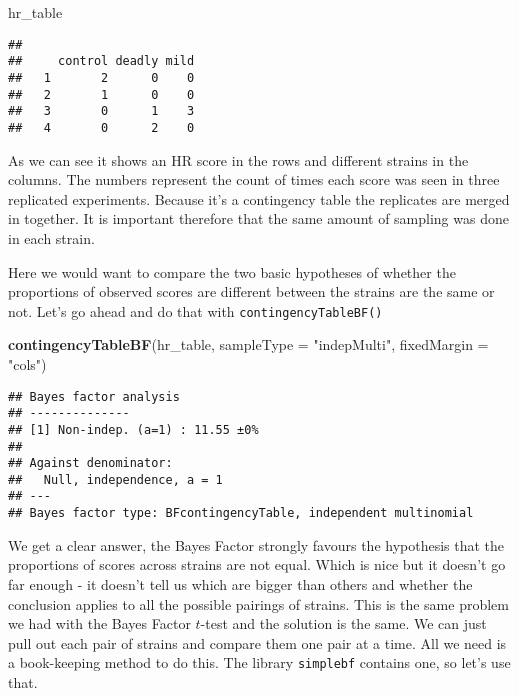 \documentclass[
]{book}
\newenvironment{Shaded}{\begin{snugshade}}{\end{snugshade}}
\newcommand{\DataTypeTok}[1]{\textcolor[rgb]{0.13,0.29,0.53}{#1}}
\newcommand{\KeywordTok}[1]{\textcolor[rgb]{0.13,0.29,0.53}{\textbf{#1}}}
\newcommand{\NormalTok}[1]{#1}
\newcommand{\StringTok}[1]{\textcolor[rgb]{0.31,0.60,0.02}{#1}}
\begin{document}
\begin{Shaded}
\begin{Highlighting}[]
\NormalTok{hr_table}
\end{Highlighting}
\end{Shaded}

\begin{verbatim}
##    
##     control deadly mild
##   1       2      0    0
##   2       1      0    0
##   3       0      1    3
##   4       0      2    0
\end{verbatim}

As we can see it shows an HR score in the rows and different strains in the columns. The numbers represent the count of times each score was seen in three replicated experiments. Because it's a contingency table the replicates are merged in together. It is important therefore that the same amount of sampling was done in each strain.

Here we would want to compare the two basic hypotheses of whether the proportions of observed scores are different between the strains are the same or not. Let's go ahead and do that with \texttt{contingencyTableBF()}

\begin{Shaded}
\begin{Highlighting}[]
\KeywordTok{contingencyTableBF}\NormalTok{(hr_table, }\DataTypeTok{sampleType =} \StringTok{"indepMulti"}\NormalTok{, }\DataTypeTok{fixedMargin =} \StringTok{"cols"}\NormalTok{)}
\end{Highlighting}
\end{Shaded}

\begin{verbatim}
## Bayes factor analysis
## --------------
## [1] Non-indep. (a=1) : 11.55 ±0%
## 
## Against denominator:
##   Null, independence, a = 1 
## ---
## Bayes factor type: BFcontingencyTable, independent multinomial
\end{verbatim}

We get a clear answer, the Bayes Factor strongly favours the hypothesis that the proportions of scores across strains are not equal. Which is nice but it doesn't go far enough - it doesn't tell us which are bigger than others and whether the conclusion applies to all the possible pairings of strains. This is the same problem we had with the Bayes Factor \(t\)-test and the solution is the same. We can just pull out each pair of strains and compare them one pair at a time. All we need is a book-keeping method to do this. The library \texttt{simplebf} contains one, so let's use that.
\end{document}
